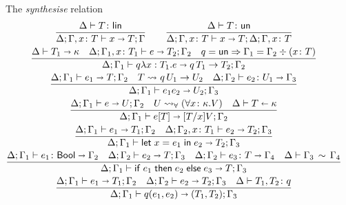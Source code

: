 \begin{figure}[h!]
  The \emph{synthesise} relation\hfill{}
  \begin{gather*}
    \frac{
      \isLin T
    }{
      \algtypeout[\kindEnv;\varEnv, x\colon T] x T \varEnv
    }
    \qquad
    \frac{
      \isUn T
    }{
      \algtypeout[\kindEnv;\varEnv, x\colon T] x T {\kindEnv;\varEnv, x\colon T}
    }
    \\
    \frac{
      \algkindout{T_1} \kind
      \quad
      \algtypeout[\kindEnv;\varEnv_1,x\colon T_1]{e}{T_2}{\varEnv_2}
      \quad
      q=\unk \Rightarrow \varEnv_1 = \varEnv_2 \div (x\colon T)
    }{
      \algtypeout[\kindEnv;\varEnv_1]{q\lambda x:T_1.e}{q\,T_1 \rightarrow T_2}{\varEnv_2}
    }
    \\
    \frac{
      \algtypeout[\kindEnv;\varEnv_1]{e_1}{T}{\varEnv_2}
      \quad
      T \Extract{} q\,U_1\rightarrow U_2
      \quad
      \algtypein[\kindEnv;\varEnv_2]{e_2}{U_1}{\varEnv_3}
    }{
      \algtypeout[\kindEnv;\varEnv_1]{e_1e_2}{U_2}{\varEnv_3}
    }
    \\
    \frac{
      \algtypeout[\kindEnv;\varEnv_1]{e}{U}{\varEnv_2}
      \quad
      U \Extract{\forall} (\forall x\colon\kind.V)
      \quad
      \algkindin T \kind
    }{
      \algtypeout[\kindEnv;\varEnv_1]{e[T]}{\subs T x V}{\varEnv_2}
    }
    \\
    \frac{
      \algtypeout[\kindEnv;\varEnv_1]{e_1}{T_1}{\varEnv_2}
      \quad
      \algtypeout[\kindEnv;\varEnv_2,x\colon T_1]{e_2}{T_2}{\Gamma_3}
    }{
      \algtypeout[\kindEnv;\varEnv_1]{\unlete{x}{e_1}{e_2}}{T_2}{\varEnv_3}
    }
    \\
    \frac{
      \algtypein[\kindEnv;\varEnv_1]{e_1}{\boole}{\varEnv_2}
      \quad
      \algtypeout[\kindEnv;\varEnv_2]{e_2}{T}{\varEnv_3}
      \quad
      \algtypein[\kindEnv;\varEnv_2]{e_3}{T}{\varEnv_4}
      \quad
      \ctxequiv{\varEnv_3}{\varEnv_4}
    }{
      \algtypeout[\kindEnv;\varEnv_1]{\conditionale{e_1}{e_2}{e_3}}{T}{\varEnv_3}
    }
    \\
    \frac{
      \algtypeout[\kindEnv ; \varEnv_1]{e_1}{T_1}{\varEnv_2}
      \quad
      \algtypeout[\kindEnv ; \varEnv_2]{e_2}{T_2}{\varEnv_3}
      \quad
      \isqualifier{T_1,T_2}{q}
    }{
      \algtypeout[\kindEnv ; \varEnv_1]{q(e_1, e_2)}{(T_1,T_2)}{\varEnv_3}
    }
    \\

\end{gather*}
\end{figure}
